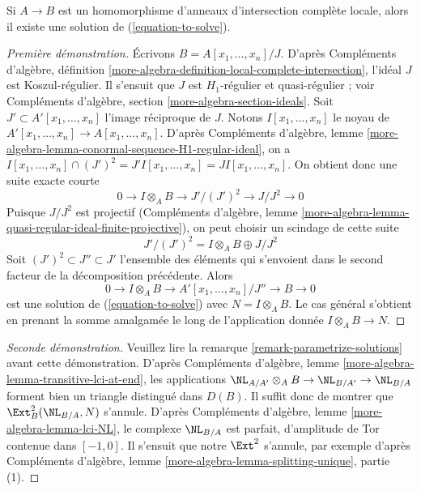 \begin{lemma}
\label{lemma-existence-lci}
Si $A \to B$ est un homomorphisme d'anneaux d'intersection complète locale, alors
il existe une solution de (\ref{equation-to-solve}).
\end{lemma}

\begin{proof}[Première démonstration]
Écrivons $B = A[x_1, \ldots, x_n]/J$. D'après Compléments d'algèbre, définition
\ref{more-algebra-definition-local-complete-intersection},
l'idéal $J$ est Koszul-régulier. Il s'ensuit que $J$ est $H_1$-régulier et
quasi-régulier ; voir Compléments d'algèbre, section \ref{more-algebra-section-ideals}.
Soit $J' \subset A'[x_1, \ldots, x_n]$
l'image réciproque de $J$. Notons $I[x_1, \ldots, x_n]$ le
noyau de $A'[x_1, \ldots, x_n] \to A[x_1, \ldots, x_n]$.
D'après Compléments d'algèbre, lemme
\ref{more-algebra-lemma-conormal-sequence-H1-regular-ideal}, on a
$I[x_1, \ldots, x_n] \cap (J')^2 = J'I[x_1, \ldots, x_n] =
JI[x_1, \ldots, x_n]$. On obtient donc une suite exacte courte
$$
0 \to I \otimes_A B \to J'/(J')^2 \to J/J^2 \to 0
$$
Puisque $J/J^2$ est projectif (Compléments d'algèbre, lemme
\ref{more-algebra-lemma-quasi-regular-ideal-finite-projective}),
on peut choisir un scindage de cette suite
$$
J'/(J')^2 = I \otimes_A B \oplus J/J^2 
$$
Soit $(J')^2 \subset J'' \subset J'$ l'ensemble des éléments qui s'envoient dans le
second facteur de la décomposition précédente. Alors
$$
0 \to I \otimes_A B \to A'[x_1, \ldots, x_n]/J'' \to B \to 0
$$
est une solution de (\ref{equation-to-solve}) avec $N = I \otimes_A B$.
Le cas général s'obtient en prenant la somme amalgamée le long de l'application donnée
$I \otimes_A B \to N$.
\end{proof}

\begin{proof}[Seconde démonstration]
Veuillez lire la remarque \ref{remark-parametrize-solutions}
avant cette démonstration. D'après
Compléments d'algèbre, lemme \ref{more-algebra-lemma-transitive-lci-at-end},
les applications $\NL_{A/A'} \otimes_A B \to \NL_{B/A'} \to \NL_{B/A}$
forment bien un triangle distingué dans $D(B)$.
Il suffit donc de montrer que $\Ext^2_B(\NL_{B/A}, N)$ s'annule.
D'après Compléments d'algèbre, lemme \ref{more-algebra-lemma-lci-NL},
le complexe $\NL_{B/A}$ est parfait, d'amplitude de Tor contenue dans
$[-1, 0]$. Il s'ensuit que notre $\Ext^2$ s'annule, par exemple
d'après Compléments d'algèbre, lemme \ref{more-algebra-lemma-splitting-unique}, partie (1).
\end{proof}






